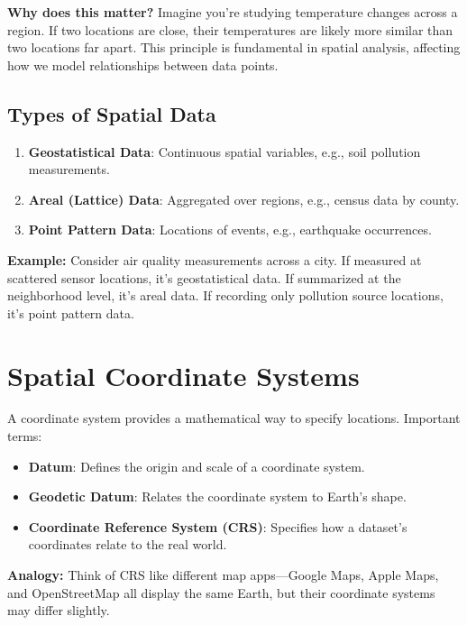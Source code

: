 \documentclass[
  11pt,
]{report}
\providecommand{\tightlist}{%
  \setlength{\itemsep}{0pt}\setlength{\parskip}{0pt}}\usepackage{longtable,booktabs,array}
\begin{document}
\textbf{Why does this matter?} Imagine you're studying temperature
changes across a region. If two locations are close, their temperatures
are likely more similar than two locations far apart. This principle is
fundamental in spatial analysis, affecting how we model relationships
between data points.

\subsection{Types of Spatial Data}\label{types-of-spatial-data}

\begin{enumerate}
\def\labelenumi{\arabic{enumi}.}
\tightlist
\item
  \textbf{Geostatistical Data}: Continuous spatial variables, e.g., soil
  pollution measurements.
\item
  \textbf{Areal (Lattice) Data}: Aggregated over regions, e.g., census
  data by county.
\item
  \textbf{Point Pattern Data}: Locations of events, e.g., earthquake
  occurrences.
\end{enumerate}

\textbf{Example:} Consider air quality measurements across a city. If
measured at scattered sensor locations, it's geostatistical data. If
summarized at the neighborhood level, it's areal data. If recording only
pollution source locations, it's point pattern data.

\section{Spatial Coordinate Systems}\label{spatial-coordinate-systems}

A coordinate system provides a mathematical way to specify locations.
Important terms:

\begin{itemize}
\tightlist
\item
  \textbf{Datum}: Defines the origin and scale of a coordinate system.
\item
  \textbf{Geodetic Datum}: Relates the coordinate system to Earth's
  shape.
\item
  \textbf{Coordinate Reference System (CRS)}: Specifies how a dataset's
  coordinates relate to the real world.
\end{itemize}

\textbf{Analogy:} Think of CRS like different map apps---Google Maps,
Apple Maps, and OpenStreetMap all display the same Earth, but their
coordinate systems may differ slightly.
\end{document}
